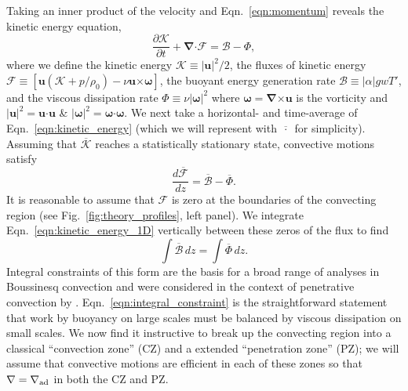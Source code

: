 \documentclass{aastex631}
\newcommand{\gradad}{\ensuremath{\nabla_{\rm{ad}}}}
\newcommand{\justgrad}{\ensuremath{\nabla}}
\renewcommand{\vec}[1]{\boldsymbol{#1}}
\renewcommand{\dot}{\vec{\cdot}}
\renewcommand{\bar}[1]{\overline{#1}}
\newcommand{\grad}{\vec{\nabla}}
\newcommand{\cross}{\vec{\times}}
\begin{document}
Taking an inner product of the velocity and Eqn.~\ref{eqn:momentum} reveals the kinetic energy equation,
\begin{equation}
\frac{\partial \mathcal{K}}{\partial t}
+ \grad\dot\mathcal{F}
= \mathcal{B} - \Phi,
\label{eqn:kinetic_energy}
\end{equation}
where we define the kinetic energy $\mathcal{K} \equiv |\vec{u}|^2/2$, the fluxes of kinetic energy $\mathcal{F} \equiv \left[\vec{u}(\mathcal{K} + p/\rho_0) - \nu\vec{u}\cross\vec{\omega} \right]$, the buoyant energy generation rate $\mathcal{B} \equiv |\alpha| g w T'$, and the viscous dissipation rate $\Phi \equiv \nu |\vec{\omega}|^2$ where $\vec{\omega} = \grad\cross\vec{u}$ is the vorticity and $|\vec{u}|^2 = \vec{u}\dot\vec{u}$ \& $|\vec{\omega}|^2 = \vec{\omega}\dot\vec{\omega}$.
We next take a horizontal- and time-average of Eqn.~\ref{eqn:kinetic_energy} (which we will represent with $\bar{\,\cdot\,}$ for simplicity).
Assuming that $\bar{\mathcal{K}}$ reaches a statistically stationary state, convective motions satisfy
\begin{equation}
\frac{d\bar{\mathcal{F}}}{dz} = \bar{\mathcal{B}} - \bar{\Phi}.
\label{eqn:kinetic_energy_1D}
\end{equation}
It is reasonable to assume that $\mathcal{F}$ is zero at the boundaries of the convecting region (see Fig.~\ref{fig:theory_profiles}, left panel).
We integrate Eqn.~\ref{eqn:kinetic_energy_1D} vertically between these zeros of the flux to find
\begin{equation}
\int \bar{\mathcal{B}}\,dz = \int \bar{\Phi}\,dz.
\label{eqn:integral_constraint}
\end{equation}
Integral constraints of this form are the basis for a broad range of analyses in Boussinesq convection \citep[see e.g.,][]{ahlers_etal_2009, goluskin2016} and were considered in the context of penetrative convection by \citet{roxburgh1989}.
Eqn.~\ref{eqn:integral_constraint} is the straightforward statement that work by buoyancy on large scales must be balanced by viscous dissipation on small scales.
We now find it instructive to break up the convecting region into a classical ``convection zone'' (CZ) and a extended ``penetration zone'' (PZ); we will assume that convective motions are efficient in each of these zones so that $\justgrad = \gradad$ in both the CZ and PZ.
\end{document}
